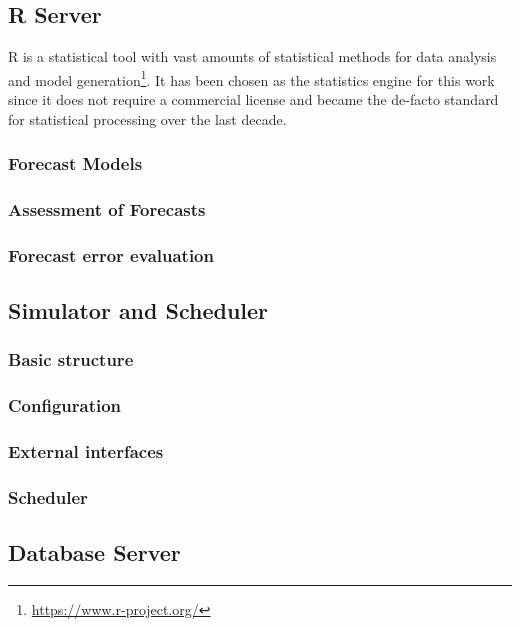 \subsection{R Server}

R is a statistical tool with vast amounts of statistical methods for data analysis and model generation\footnote{\url{https://www.r-project.org/}}. It has been chosen as the statistics engine for this work since it does not require a commercial license and became the de-facto standard for statistical processing over the last decade. 

\subsubsection{Forecast Models}

\subsubsection{Assessment of Forecasts}

\subsubsection{Forecast error evaluation}




\subsection{Simulator and Scheduler}

\subsubsection{Basic structure}

\subsubsection{Configuration}

\subsubsection{External interfaces}

\subsubsection{Scheduler}


\subsection{Database Server}

